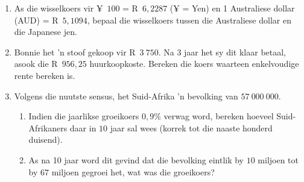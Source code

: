 \begin{eocexercises}{}
\begin{enumerate}[label=\textbf{\arabic*}.]
	\item As die wisselkoers vir ¥~$100$ = R~$6,2287$ (¥ = Yen) en 1 Australiese dollar (AUD) = R~$5,1094$, bepaal die wisselkoers
tussen die Australiese dollar en die Japanese jen.
	\item Bonnie het ’n stoof gekoop vir R~$3~750$. Na 3 jaar het sy dit klaar betaal, asook die R~$956,25$ huurkoopkoste.
Bereken die koers waarteen enkelvoudige rente bereken is.
	\item Volgens die nuutste sensus, het Suid-Afrika 'n bevolking van $57~000~000$.
	\begin{enumerate}[noitemsep, label=\textbf{(\alph*)} ]
	    \item Indien die jaarlikse groeikoers $0,9\%$ verwag word, bereken hoeveel Suid-Afrikaners daar in $10$ jaar sal wees (korrek tot die naaste honderd duisend).

	    \item As na 10 jaar word dit gevind dat die bevolking eintlik by $10$ miljoen tot by $67$ miljoen gegroei het, wat was die groeikoers?
	\end{enumerate}
    \end{enumerate}
\end{eocexercises}


